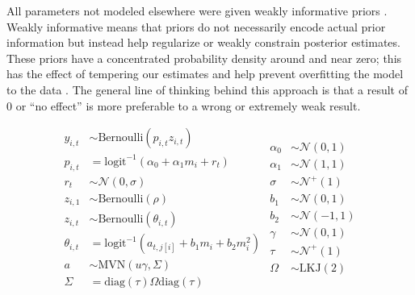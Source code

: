 All parameters not modeled elsewhere were given weakly informative priors \citep{Gelman2013d,McElreath2016,StanDevelopmentTeam2016}. Weakly informative means that priors do not necessarily encode actual prior information but instead help regularize or weakly constrain posterior estimates. These priors have a concentrated probability density around and near zero; this has the effect of tempering our estimates and help prevent overfitting the model to the data \citep{Gelman2013d,McElreath2016,StanDevelopmentTeam2016}. The general line of thinking behind this approach is that a result of 0 or ``no effect'' is more preferable to a wrong or extremely weak result.

\begin{equation}
  \begin{split}
    y_{i, t} &\sim \text{Bernoulli}(p_{i, t} z_{i, t}) \\
    p_{i, t} &= \text{logit}^{-1}(\alpha_{0} + \alpha_{1} m_{i} + r_{t}) \\ 
    r_{t} &\sim \mathcal{N}(0, \sigma) \\
    z_{i, 1} &\sim \text{Bernoulli}(\rho) \\
    z_{i, t} &\sim \text{Bernoulli}(\theta_{i, t}) \\
    \theta_{i, t} &= \text{logit}^{-1}(a_{t, j[i]} + b_{1} m_{i} + b_{2} m_{i}^{2}) \\
    a &\sim \text{MVN}(u \gamma, \Sigma) \\
    \Sigma &= \text{diag}(\tau) \Omega \text{diag}(\tau) \\
  \end{split}
  \begin{split}
    \alpha_{0} &\sim \mathcal{N}(0, 1) \\
    \alpha_{1} &\sim \mathcal{N}(1, 1) \\
    \sigma &\sim \mathcal{N}^{+}(1) \\
    b_{1} &\sim \mathcal{N}(0, 1) \\
    b_{2} &\sim \mathcal{N}(-1, 1) \\
    \gamma &\sim \mathcal{N}(0, 1) \\
    \tau &\sim \mathcal{N}^{+}(1) \\
    \Omega &\sim \text{LKJ}(2) \\
  \end{split}
  \label{eq:pure_presence}
\end{equation}


